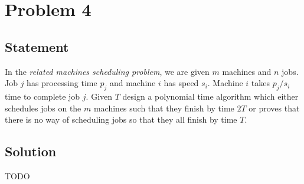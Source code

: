 \documentclass[a4paper]{article}
\begin{document}
\newpage

\section{Problem 4}
\subsection{Statement}
In the \emph{related machines scheduling problem}, we are given $m$ machines and $n$ jobs. Job $j$ has processing time $p_j$ and machine $i$ has speed $s_i$.  Machine $i$ takes $p_j/s_i$ time to
complete job $j$. Given $T$ design a polynomial time algorithm which either schedules jobs on the $m$ machines such that they finish by time $2T$ or proves that there is no way of scheduling jobs so
that they all finish by time $T$.
\subsection{Solution}
TODO
\end{document}
